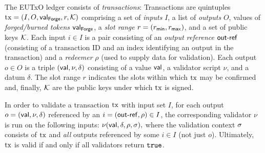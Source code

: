 The EUTxO ledger consists of \emph{transactions}: Transactions are
quintuples $\mathrm{tx} = (I,O,\mathsf{val}_\mathsf{Forge},r,\mathcal K)$ comprising a set of
\emph{inputs} $I$, a list of \emph{outputs} $O$, values of
\emph{forged/burned tokens} $\mathsf{val}_\mathsf{Forge}$, a \emph{slot range}
\(r = (r_{\mathsf{min}}, r_{\mathsf{max}})\), and a set of public keys $\mathcal K$.
%
Each input \(i\in I\) is a pair consisting of an \emph{output
  reference} $\mathsf{out\textsf{-}{}ref}$ (consisting of a transaction ID and an index
identifying an output in the transaction) and a \emph{redeemer} $\rho$
(used to supply data
for validation).
% 
Each output \(o\in O\)
is %
a triple \((\mathsf{val}, \nu, \delta)\) consisting of a value $\mathsf{val}$, a
validator script $\nu$, and a datum
$\delta$. %
%
The slot range $r$ indicates the slots within which $\mathrm{tx}$ may be
confirmed and, finally, $\mathcal K$ are the public keys under which
$\mathrm{tx}$ is signed.

In order to validate a transaction $\mathrm{tx}$ with input set $I$, for each
output $o = (\mathsf{val},\nu,\delta)$ referenced by an
$i = (\mathsf{out\textsf{-}{}ref},\rho) \in I$, the corresponding validator $\nu$ is run
on the following inputs:
\(
  \nu(\mathsf{val},\delta,\rho,\sigma),
\)
where the validation context $\sigma$ consists of $\mathrm{tx}$ and \emph{all} outputs
referenced by some $i \in I$ (not just $o$).  Ultimately, $\mathrm{tx}$ is
valid if and only if all validators return $\mathtt{true}$.


  

